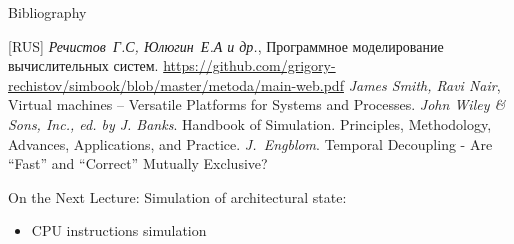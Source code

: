 \begin{frame}[allowframebreaks]{Bibliography}
\begin{thebibliography}{99}
  \bibitem{} [RUS] \textit{Речистов~Г.С, Юлюгин~Е.А и др.},
    Программное моделирование вычислительных систем.
    \url{https://github.com/grigory-rechistov/simbook/blob/master/metoda/main-web.pdf}
  \bibitem{} \textit{James Smith, Ravi Nair}, Virtual machines -- Versatile
    Platforms for Systems and Processes.
  \bibitem{} \textit{John Wiley \& Sons, Inc., ed. by J. Banks}. Handbook of
    Simulation. Principles, Methodology, Advances, Applications, and Practice.
  \bibitem{} \textit{J.~Engblom}. Temporal Decoupling - Are “Fast” and
    “Correct” Mutually Exclusive?
\end{thebibliography}
\end{frame}

\begin{frame}{On the Next Lecture:}
Simulation of architectural state:
\begin{itemize}
\item CPU instructions simulation
\end{itemize}
\end{frame}
\finalslide



